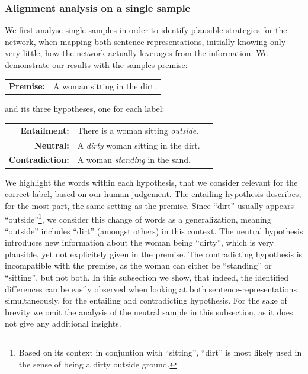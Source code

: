 \subsubsection{Alignment analysis on a single sample}
We first analyse single samples in order to identify plausible strategies for the network, when mapping both sentence-representations, initially knowing only very little, how the network actually leverages from the information. We demonstrate our results with the samples premise:
\begin{center}
\begin{tabular}{rl}
	\textbf{Premise:} & A woman sitting in the dirt.
\end{tabular}
\end{center}
and its three hypotheses, one for each label:
\begin{center}
\begin{tabular}{rll}
	\textbf{Entailment:} & There is a woman sitting \textit{outside}. \\
	\textbf{Neutral:} & A \textit{dirty} woman sitting in the dirt. \\
	\textbf{Contradiction:} & A woman \textit{standing} in the sand. \\
\end{tabular}
\end{center}
We highlight the words within each hypothesis, that we consider relevant for the correct label, based on our human judgement. The entailing hypothesis describes, for the most part, the same setting as the premise. Since ``dirt'' usually appears ``outside''\footnote{Based on its context in conjuntion with ``sitting'', ``dirt'' is most likely used in the sense of being a dirty outside ground.}, we consider this change of words as a generalization, meaning ``outside'' includes ``dirt'' (amongst others) in this context. The neutral hypothesis introduces new information about the woman being ``dirty'', which is very plausible, yet not explicitely given in the premise. The contradicting hypothesis is incompatible with the premise, as the woman can either be ``standing'' or ``sitting'', but not both. In this subsection we show, that indeed, the identified differences can be easily observed when looking at both sentence-representations simultaneously, for the entailing and contradicting hypothesis. For the sake  of brevity we omit the analysis of the neutral sample in this subsection, as it does not give any additional insights.

